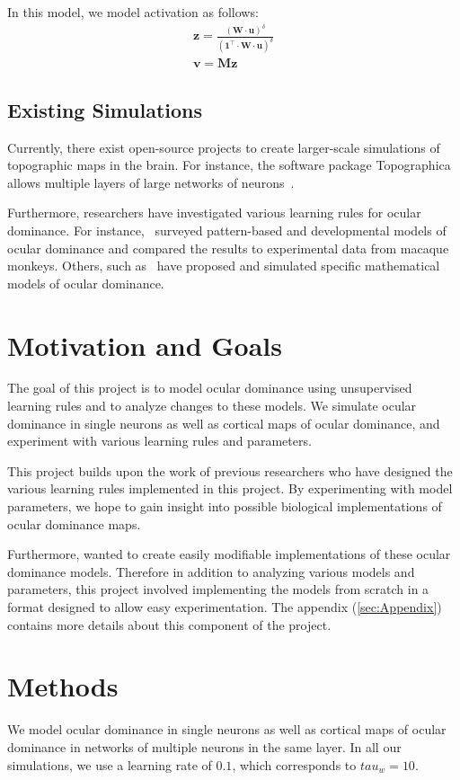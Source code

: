 \documentclass[pageno]{mat323paper}
\begin{document}
In this model, we model activation as follows:
\begin{align}
\mathbf{z}=\frac{(\mathbf{W}\cdot\mathbf{u})^\delta}{(\mathbf{1}^\top\cdot\mathbf{W}\cdot\mathbf{u})^\delta}\\
\mathbf{v}=\mathbf{M}\mathbf{z}
\end{align}

\subsection{Existing Simulations}
Currently, there exist open-source projects to create larger-scale simulations of topographic maps in the brain. For instance, the software package Topographica allows multiple layers of large networks of neurons~\cite{bednar_topographica_2009}.

Furthermore, researchers have investigated various learning rules for ocular dominance. For instance,~\cite{erwin_models_1995} surveyed pattern-based and developmental models of ocular dominance and compared the results to experimental data from macaque monkeys. Others, such as~\cite{miller_ocular_1989} have proposed and simulated specific mathematical models of ocular dominance.

\section{Motivation and Goals}
The goal of this project is to model ocular dominance using unsupervised learning rules and to analyze changes to these models. We simulate ocular dominance in single neurons as well as cortical maps of ocular dominance, and experiment with various learning rules and parameters.

This project builds upon the work of previous researchers who have designed the various learning rules implemented in this project. By experimenting with model parameters, we hope to gain insight into possible biological implementations of ocular dominance maps. 

Furthermore, wanted to create easily modifiable implementations of these ocular dominance models. Therefore in addition to analyzing various models and parameters, this project involved implementing the models from scratch in a format designed to allow easy experimentation. The appendix (\ref{sec:Appendix}) contains more details about this component of the project.

\section{Methods}
We model ocular dominance in single neurons as well as cortical maps of ocular dominance in networks of multiple neurons in the same layer. In all our simulations, we use a learning rate of $0.1$, which corresponds to $tau_w=10$.
\end{document}
